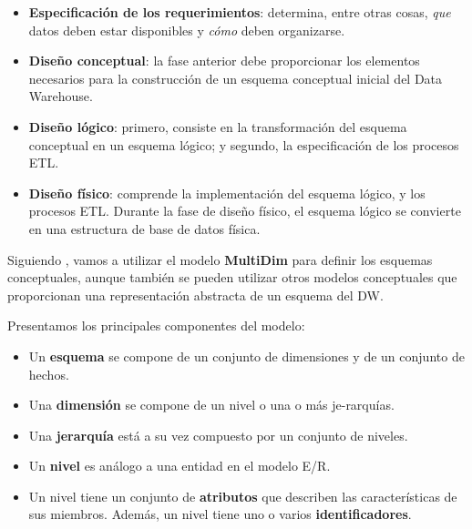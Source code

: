 \documentclass{fancyslides}
\begin{document}
\begin{frame}
\misc
{

\begin{itemize}
  \item \textbf{Especificación de los requerimientos}: \justifying determina, entre otras cosas, \textit{que} datos deben estar disponibles y \textit{cómo} deben organizarse. 
  \item \textbf{Diseño conceptual}: \justifying la fase anterior debe proporcionar los elementos necesarios para la construcción de un esquema conceptual inicial del Data Warehouse.
  \item \textbf{Diseño lógico}: \justifying primero, consiste en la transformación del esquema conceptual en un esquema lógico; y segundo, la especificación de los procesos ETL.
  \item \textbf{Diseño físico}: \justifying comprende la implementación del esquema lógico, y los procesos ETL. Durante la fase de diseño físico, el esquema lógico se convierte en una estructura de base de datos física.
\end{itemize}

}
\end{frame}

\begin{frame}
\end{frame}

\begin{frame}
\misc
{
\justifying Siguiendo \cite{VaismanZimanyi14}, vamos a utilizar el modelo \textbf{MultiDim} para definir los esquemas conceptuales, aunque también se pueden utilizar otros modelos conceptuales que proporcionan una representación abstracta de un esquema del DW.
}
\end{frame}

\begin{frame}
\misc
{
Presentamos los principales componentes del modelo:
\begin{itemize}
  \item \justifying Un \textbf{esquema} se compone de un conjunto de dimensiones y de un conjunto de hechos.
  \item \justifying Una \textbf{dimensión} se compone de un nivel o una o más je-rarquías.
  \item \justifying Una \textbf{jerarquía} está a su vez compuesto por un conjunto de niveles.
  \item \justifying Un \textbf{nivel} es análogo a una entidad en el modelo E/R.
  \item \justifying Un nivel tiene un conjunto de \textbf{atributos} que describen las características de sus miembros. Además, un nivel tiene uno o varios \textbf{identificadores}.
\end{itemize}
}
\end{frame}
\end{document}
